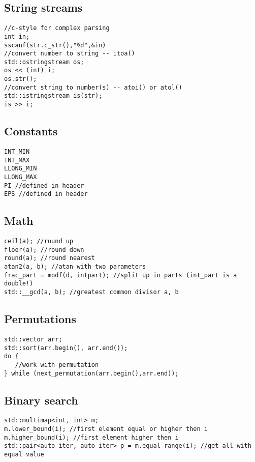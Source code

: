 \subsection{String streams}
\begin{verbatim}
//c-style for complex parsing
int in;
sscanf(str.c_str(),"%d",&in)
//convert number to string -- itoa()
std::ostringstream os;
os << (int) i;
os.str();
//convert string to number(s) -- atoi() or atol()
std::istringstream is(str);
is >> i;
\end{verbatim}

\subsection{Constants}
\begin{verbatim}
INT_MIN
INT_MAX
LLONG_MIN
LLONG_MAX
PI //defined in header
EPS //defined in header
\end{verbatim}

\subsection{Math}
\begin{verbatim}
ceil(a); //round up
floor(a); //round down
round(a); //round nearest
atan2(a, b); //atan with two parameters
frac_part = modf(d, intpart); //split up in parts (int_part is a double!)
std::__gcd(a, b); //greatest common divisor a, b
\end{verbatim}

\subsection{Permutations}
\begin{verbatim}
std::vector arr;
std::sort(arr.begin(), arr.end());
do {
   //work with permutation
} while (next_permutation(arr.begin(),arr.end));
\end{verbatim}

\subsection{Binary search}
\begin{verbatim}
std::multimap<int, int> m;
m.lower_bound(i); //first element equal or higher then i
m.higher_bound(i); //first element higher then i
std::pair<auto iter, auto iter> p = m.equal_range(i); //get all with equal value
\end{verbatim} 

